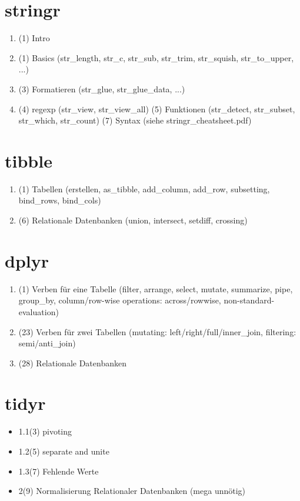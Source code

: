 \documentclass{article}
\begin{document}
\section{stringr}
\begin{enumerate}
    \item (1) Intro
    \item (1) Basics (str\_length, str\_c, str\_sub, str\_trim, str\_squish, str\_to\_upper, ...)
    \item (3) Formatieren (str\_glue, str\_glue\_data, ...)
    \item (4) regexp (str\_view, str\_view\_all)
        \subitem (5) Funktionen (str\_detect, str\_subset, str\_which, str\_count)
        \subitem (7) Syntax (siehe stringr\_cheatsheet.pdf)
\end{enumerate}



\section{tibble}
\begin{enumerate}
    \item (1) Tabellen (erstellen, as\_tibble, add\_column, add\_row, subsetting, bind\_rows, bind\_cols)
    \item (6) Relationale Datenbanken (union, intersect, setdiff, crossing)
\end{enumerate}

\section{dplyr}
\begin{enumerate}
    \item (1) Verben für eine Tabelle (filter, arrange, select, mutate, summarize, pipe, group\_by, column/row-wise operations: across/rowwise, non-standard-evaluation)
    \item (23) Verben für zwei Tabellen (mutating: left/right/full/inner\_join, filtering: semi/anti\_join)
    \item (28) Relationale Datenbanken
\end{enumerate}

\section{tidyr}
\begin{itemize}
    \item 1.1(3) pivoting
    \item 1.2(5) separate and unite
    \item 1.3(7) Fehlende Werte
    \item 2(9) Normalisierung Relationaler Datenbanken (mega unnötig)
\end{itemize}
\end{document}

